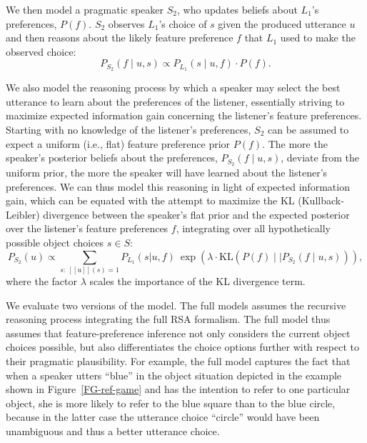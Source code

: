\documentclass[11pt,a4paper]{article}
\newcommand{\gcs}[1]{\textcolor{blue}{[gcs: #1]}}
\begin{document}
We then model a pragmatic speaker $S_2$, who updates beliefs about $L_1$'s preferences, $P(f)$.
$S_2$ observes $L_1$'s choice of $s$ given the produced utterance $u$ and then reasons about the likely feature preference $f$ that $L_1$ used to make the observed choice:
\begin{equation}
P_{S_{2}}(f\mid u,s) \propto P_{L_{1}}(s \mid u,f) \cdot P(f).
\end{equation}


We also model the reasoning process by which a speaker may select the best utterance to learn about the preferences of the listener, essentially striving to maximize expected information gain concerning the listener's feature preferences.
Starting with no knowledge of the listener's preferences, $S_2$ can be assumed to expect a uniform (i.e., flat) feature preference prior $P(f)$.
The more the speaker's posterior beliefs about the preferences, $P_{S_{2}}(f\mid u,s)$, deviate from the uniform prior, the more the speaker will have learned about the listener's preferences. 
We can thus model this reasoning in light of expected information gain, which can be equated with the attempt to maximize the KL (Kullback-Leibler) divergence between the speaker's flat prior and the expected posterior over the listener's feature preferences $f$, integrating over all hypothetically possible object choices $s \in S$: %
\begin{equation}
P_{S_2}(u) \propto \sum_{s:\  [\![u]\!](s)=1} P_{L_1}(s|u,f)\ \exp(\lambda \cdot \textrm{KL}(P(f)\mid\mid P_{S_{2}}(f\mid u,s))),
\label{eq:kldivlambda}
\end{equation}
where the factor $\lambda$ scales the importance of the KL divergence term. 


We evaluate two versions of the model. 
The full models assumes the recursive reasoning process integrating the full RSA formalism.  
The full model thus assumes that feature-preference inference not only considers the current object choices possible, but also differentiates the choice options further with respect to their pragmatic plausibility. 
For example, the full model captures the fact that when a speaker utters ``blue'' in the object situation depicted in the example shown in Figure~\ref{FG-ref-game} and has the intention to refer to one particular object, she is more likely to refer to the blue square than to the blue circle, because in the latter case the utterance choice ``circle'' would have been unambiguous and thus a better utterance choice.
\end{document}
